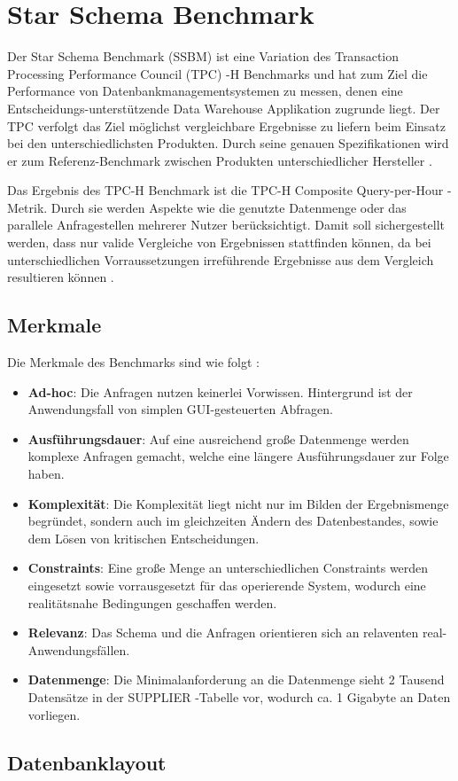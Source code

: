 \chapter{Star Schema Benchmark}\label{chapter:ssbm}

Der Star Schema Benchmark (SSBM) ist eine Variation des Transaction Processing Performance Council (TPC) -H Benchmarks und hat zum Ziel die Performance von Datenbankmanagementsystemen zu messen, denen eine Entscheidungs-unterstützende Data Warehouse Applikation zugrunde liegt. Der TPC verfolgt das Ziel möglichst vergleichbare Ergebnisse zu liefern beim Einsatz bei den unterschiedlichsten Produkten. Durch seine genauen  Spezifikationen wird er zum Referenz-Benchmark zwischen Produkten unterschiedlicher Hersteller \cite[vgl.][]{tpch2}. 

Das Ergebnis des TPC-H Benchmark ist die {\glqq}TPC-H Composite Query-per-Hour{\grqq} -Metrik. Durch sie werden Aspekte wie die genutzte Datenmenge oder das parallele Anfragestellen mehrerer Nutzer berücksichtigt. Damit soll sichergestellt werden, dass nur valide Vergleiche von Ergebnissen stattfinden können, da bei unterschiedlichen Vorraussetzungen irreführende Ergebnisse aus dem Vergleich resultieren können \cite[vgl.][]{tpch2}. 

\section{Merkmale}
Die Merkmale des Benchmarks sind wie folgt \cite[vgl.][]{tpch3}: 
\begin{itemize}
	\item \textbf{Ad-hoc}: Die Anfragen nutzen keinerlei Vorwissen. Hintergrund ist der Anwendungsfall von simplen GUI-gesteuerten Abfragen. 
	\item \textbf{Ausführungsdauer}: Auf eine ausreichend große Datenmenge werden komplexe Anfragen gemacht, welche eine längere Ausführungsdauer zur Folge haben. 
	\item \textbf{Komplexität}: Die Komplexität liegt nicht nur im Bilden der Ergebnismenge begründet, sondern auch im gleichzeiten Ändern des Datenbestandes, sowie dem Lösen von kritischen Entscheidungen. 
	\item \textbf{Constraints}: Eine große Menge an unterschiedlichen Constraints werden eingesetzt sowie vorrausgesetzt für das operierende System, wodurch eine realitätsnahe Bedingungen geschaffen werden. 
	\item \textbf{Relevanz}: Das Schema und die Anfragen orientieren sich an relaventen real-Anwendungsfällen. 
	\item \textbf{Datenmenge}: Die Minimalanforderung an die Datenmenge sieht 2 Tausend Datensätze in der {\glqq}SUPPLIER{\grqq} -Tabelle vor, wodurch ca. 1 Gigabyte an Daten vorliegen. 
\end{itemize}

\section{Datenbanklayout}

\begin{figure}[htp] 
\end{figure}  